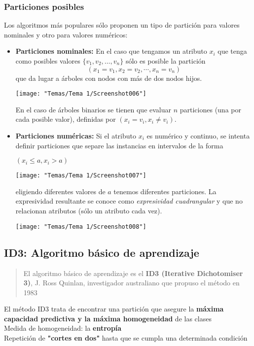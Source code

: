 \subsubsection{Particiones posibles}
Los algoritmos más populares sólo proponen un tipo de partición para valores nominales y otro para valores numéricos:
\begin{itemize}
	\item \textbf{Particiones nominales:} En el caso que tengamos un atributo $x_i$ que tenga como posibles valores $\{v_1,v_2,\dots,v_n\}$ sólo es posible la partición \[ (x_1=v_1,x_2=v_2,\cdots,x_n=v_n) \]que da lugar a árboles con nodos con más de dos nodos hijos.
	\begin{center}
		\texttt{[image: "Temas/Tema 1/Screenshot006"]}
	\end{center}
	En el caso de árboles binarios se tienen que evaluar $n$ particiones (una por cada posible valor), definidas por $(x_i=v_i,x_i\neq v_i)$.
	\item \textbf{Particiones numéricas:} Si el atributo $x_i$ es numérico y continuo, se intenta definir particiones que separe las instancias en intervalos de la forma \begin{center}
		$(x_i\le a,x_i>a)$\qquad\begin{minipage}{0.3\textwidth}
			\texttt{[image: "Temas/Tema 1/Screenshot007"]}
		\end{minipage}
	\end{center}
	eligiendo diferentes valores de $a$ tenemos diferentes particiones. La expresividad resultante se conoce como \textit{expresividad cuadrangular} y que no relacionan atributos (sólo un atributo cada vez).
	\begin{center}
		\texttt{[image: "Temas/Tema 1/Screenshot008"]}
	\end{center}
	
\end{itemize}
\subsection{ID3: Algoritmo básico de aprendizaje}

\begin{quote}
	El algoritmo básico de aprendizaje es el \textbf{ID3 (Iterative Dichotomiser 3)}, J. Ross Quinlan, investigador australiano que propuso el método en 1983
\end{quote}
El método ID3 trata de encontrar una partición que asegure la \textbf{máxima capacidad predictiva y la máxima homogeneidad} de las clases\\
Medida de homogeneidad: la \textbf{entropía}\\
Repetición de \textbf{"cortes en dos"} hasta que se cumpla una determinada condición
